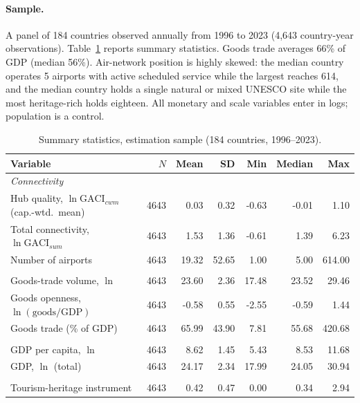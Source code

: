 \paragraph{Sample.} A panel of 184 countries observed annually from 1996 to
2023 (4{,}643 country-year observations). Table~\ref{tab:sumstat} reports
summary statistics. Goods trade averages 66\% of GDP (median 56\%). Air-network
position is highly skewed: the median country operates 5 airports with active
scheduled service while the largest reaches 614, and the median country holds a
single natural or mixed UNESCO site while the most heritage-rich holds eighteen.
All monetary and scale variables enter in logs; population is a control.

\begin{table}[t]
\centering
\caption{Summary statistics, estimation sample (184 countries, 1996--2023).}
\label{tab:sumstat}
\begin{threeparttable}
\small
\begin{tabular}{lrrrrrr}
\toprule
Variable & $N$ & Mean & SD & Min & Median & Max \\
\midrule
\multicolumn{7}{l}{\emph{Connectivity}}\\
Hub quality, $\ln\mathrm{GACI}_{cwm}$ (cap.-wtd.\ mean) & 4643 & 0.03 & 0.32 & -0.63 & -0.01 & 1.10 \\
Total connectivity, $\ln\mathrm{GACI}_{sum}$ & 4643 & 1.53 & 1.36 & -0.61 & 1.39 & 6.23 \\
Number of airports & 4643 & 19.32 & 52.65 & 1.00 & 5.00 & 614.00 \\
\addlinespace
\multicolumn{7}{l}{\emph{Trade outcomes}}\\
Goods-trade volume, $\ln$ & 4643 & 23.60 & 2.36 & 17.48 & 23.52 & 29.46 \\
Goods openness, $\ln(\text{goods}/\text{GDP})$ & 4643 & -0.58 & 0.55 & -2.55 & -0.59 & 1.44 \\
Goods trade (\% of GDP) & 4643 & 65.99 & 43.90 & 7.81 & 55.68 & 420.68 \\
\addlinespace
\multicolumn{7}{l}{\emph{Income}}\\
GDP per capita, $\ln$ & 4643 & 8.62 & 1.45 & 5.43 & 8.53 & 11.68 \\
GDP, $\ln$ (total) & 4643 & 24.17 & 2.34 & 17.99 & 24.05 & 30.94 \\
\addlinespace
\multicolumn{7}{l}{\emph{Instrument and heritage}}\\
Tourism-heritage instrument & 4643 & 0.42 & 0.47 & 0.00 & 0.34 & 2.94 \\

\end{tabular}
\end{threeparttable}
\end{table}
